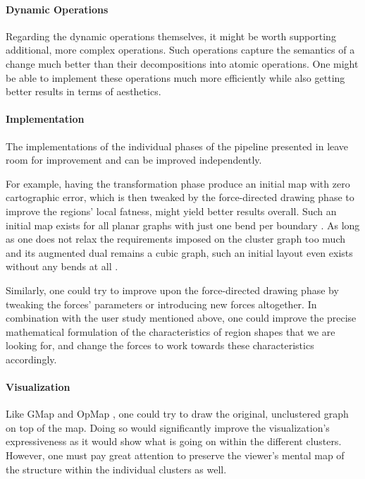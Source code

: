 \paragraph{Dynamic Operations}

Regarding the dynamic operations themselves, it might be worth supporting additional, more complex operations.
Such operations capture the semantics of a change much better than their decompositions into atomic operations.
One might be able to implement these operations much more efficiently while also getting better results in terms of aesthetics.


\paragraph{Implementation}

The implementations of the individual phases of the pipeline presented in  leave room for improvement and can be improved independently.

For example, having the transformation phase produce an initial map with zero cartographic error, which is then tweaked by the force-directed drawing phase to improve the regions' local fatness, might yield better results overall.
Such an initial map exists for all planar graphs with just one bend per boundary \cite{kleist2019planar}.
As long as one does not relax the requirements imposed on the cluster graph too much and its augmented dual remains a cubic graph, such an initial layout even exists without any bends at all \cite{thomassen1992plane}.

Similarly, one could try to improve upon the force-directed drawing phase by tweaking the forces' parameters or introducing new forces altogether.
In combination with the user study mentioned above, one could improve the precise mathematical formulation of the characteristics of region shapes that we are looking for, and change the forces to work towards these characteristics accordingly.


\paragraph{Visualization}

Like GMap \cite{gansner2009gmap} and OpMap \cite{schmettow2017}, one could try to draw the original, unclustered graph on top of the map.
Doing so would significantly improve the visualization's expressiveness as it would show what is going on within the different clusters.
However, one must pay great attention to preserve the viewer's mental map of the structure within the individual clusters as well.

